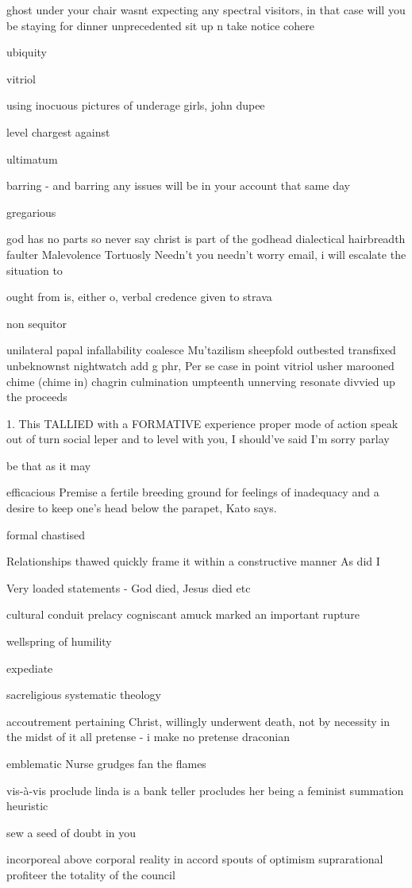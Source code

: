 ghost under your chair
wasnt expecting any spectral visitors, in that case will you be staying for dinner
unprecedented
sit up n take notice
cohere



ubiquity

vitriol

using inocuous pictures of underage girls, john dupee

level chargest against

ultimatum

barring - and barring any issues will be in your account that same day

gregarious

god has no parts so never say christ is part of the godhead
dialectical
hairbreadth
faulter
Malevolence
Tortuosly
Needn't you needn't worry
email, i will escalate the situation to

ought from is, either o, verbal credence given to
strava

non sequitor

unilateral papal infallability
coalesce
Mu'tazilism
sheepfold
outbested
transfixed
unbeknownst
nightwatch
add g phr,
Per se
case in point
vitriol
usher
marooned
chime (chime in)
chagrin
culmination
umpteenth
unnerving
resonate
divvied up the proceeds

1. This TALLIED with a FORMATIVE experience
proper mode of action
speak out of turn
social leper
and to level with you, I should've said I'm sorry
parlay

be that as it may

efficacious
Premise
 a fertile breeding ground for feelings of inadequacy and a desire to keep one’s head below the parapet, Kato says.

formal
chastised

Relationships thawed
quickly frame it within a constructive manner
As did I

Very loaded statements - God died, Jesus died etc


cultural conduit
prelacy
cogniscant
amuck
marked an important rupture

wellspring of humility

expediate

sacreligious
systematic theology


accoutrement
pertaining
Christ, willingly underwent death, not by necessity
in the midst of it all
pretense - i make no pretense
draconian

emblematic
Nurse grudges
fan the flames

vis-à-vis
proclude
linda is a bank teller procludes her being a feminist
summation
heuristic

sew a seed of doubt in you

incorporeal above corporal reality
in accord
spouts of optimism
suprarational
profiteer
the totality of the council



